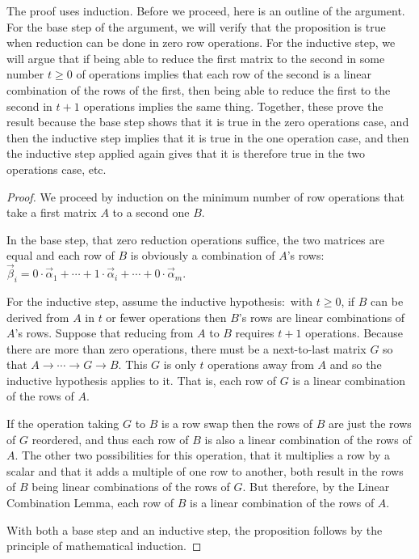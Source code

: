 The proof 
uses induction. %
Before we proceed, here is an outline of the argument.
For the base step of the argument, we
will verify that the proposition is true when reduction 
can be done in zero row operations.
For the inductive step, we will 
argue that if being able to reduce the first matrix to the second in some
number $t\geq 0$ of operations implies that each row of the second is a linear
combination of the rows of the first, then being able to reduce the first to
the second in $t+1$ operations implies the same thing.
Together, these prove the result because  
the base step shows that it is true in the zero operations case,
and then the inductive step
implies that it is true in the one operation case, and then the inductive step
applied again gives that it is therefore true in the two operations case, etc.

\begin{proof}
We proceed by induction on the minimum number of row operations that take a
first matrix $A$ to a second one $B$.

In the base step, that
zero reduction operations suffice, the two matrices are equal and each 
row of $B$ is obviously a combination of
$A$'s rows: $\vec{\beta}_i
  =0\cdot\vec{\alpha}_1+\cdots+1\cdot\vec{\alpha}_i+\cdots+0\cdot\vec{\alpha}_m$.

For the inductive step, assume the inductive hypothesis:~with $t\geq 0$,
if \( B \) can be derived from \( A \) in \( t \) or fewer operations 
then \( B\)'s rows are linear combinations of $A$'s rows.
Suppose that reducing from \( A \) to \( B \) requires $t+1$ operations.
Because there are more than zero operations, 
there must be a next-to-last matrix $G$  
so that $A\longrightarrow\cdots\longrightarrow G\longrightarrow B$.
This \( G \) is only $t$ operations away from \( A \) and so the inductive
hypothesis applies to it. 
That is, each row of \( G \)
is a linear combination of the rows of \( A \).

If the operation taking \( G \) to \( B \) is a row swap then
the rows of $B$ are just the rows of $G$ reordered, and thus each row of $B$
is also a linear combination of the rows of $A$.
The other two possibilities for this operation, that it multiplies a 
row by a scalar and that it adds a multiple of one row to another, both result
in the rows of $B$ being linear combinations of the rows of $G$.
But therefore, by the Linear Combination Lemma, each row of $B$ is a linear
combination of the rows of $A$.

With both a base step and an inductive step,  
the proposition follows by the principle of mathematical induction.
\end{proof}


